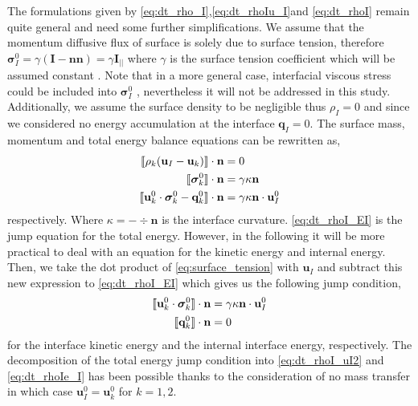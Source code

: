 The formulations given by \ref{eq:dt_rho_I},\ref{eq:dt_rhoIu_I}and \ref{eq:dt_rhoI} remain quite general and need some further simplifications. 
We assume that the momentum diffusive flux of surface is solely due to surface tension, therefore $\bm{\sigma}_I^0  = \gamma (\textbf{I} - \textbf{nn}) = \gamma \textbf{I}_{||}$ where $\gamma$ is the surface tension coefficient which will be assumed constant \citep[Chapter 2]{tryggvason2011direct}.  
Note that in a more general case, interfacial viscous stress could be included into $\bm{\sigma}_{I}^0$ \citep{brenner2013interfacial,slattery2007interfacial,nadim1996concise}, nevertheless it will not be addressed in this study. 
Additionally, we assume the surface density to be negligible thus $\rho_I = 0$ and since we considered no energy accumulation at the interface $\textbf{q}_I=0$. 
The surface mass, momentum and total energy balance equations can be rewritten as, 
\begin{align}
    \label{eq:dt_rho_I}
    \llbracket 
        \rho_k (\textbf{u}_I - \textbf{u}_k)
     \rrbracket \cdot \textbf{n}
    &=0 \\
    \llbracket \bm{\sigma}_k^0 \rrbracket \cdot \textbf{n} 
    &=
    \gamma\kappa\textbf{n}
    \label{eq:surface_tension}\\
    \label{eq:dt_rhoI_EI}
    \llbracket \textbf{u}_k^0 \cdot \bm{\sigma}_k^0 - \textbf{q}_k^0 \rrbracket \cdot \textbf{n}
    &= 
     \gamma\kappa\textbf{n}\cdot \textbf{u}_{I}^0
\end{align}
respectively. 
Where $\kappa = - \div\textbf{n}$ is the interface curvature.
\ref{eq:dt_rhoI_EI} is the jump equation for the total energy.
However, in the following it will be more practical to deal with an equation for the kinetic energy and internal energy. 
Then, we take the dot product of \ref{eq:surface_tension} with $\textbf{u}_I$ and subtract this new expression to \ref{eq:dt_rhoI_EI} which gives us the following jump condition, 
\begin{align}
    \label{eq:dt_rhoI_uI2}
    \llbracket \textbf{u}_k^0 \cdot \bm{\sigma}_k^0 \rrbracket \cdot \textbf{n}
    &= 
     \gamma\kappa\textbf{n}\cdot \textbf{u}_{I}^0\\
    \label{eq:dt_rhoIe_I}
    \llbracket  \textbf{q}_k^0 \rrbracket \cdot \textbf{n}
    &= 
     0
\end{align}
for the interface kinetic energy and the internal interface energy, respectively. 
The decomposition of the total energy jump condition into \ref{eq:dt_rhoI_uI2} and \ref{eq:dt_rhoIe_I} has been possible thanks to the consideration of no mass transfer in which case $\textbf{u}_I^0=\textbf{u}_k^0$ for $k =1,2$. 

